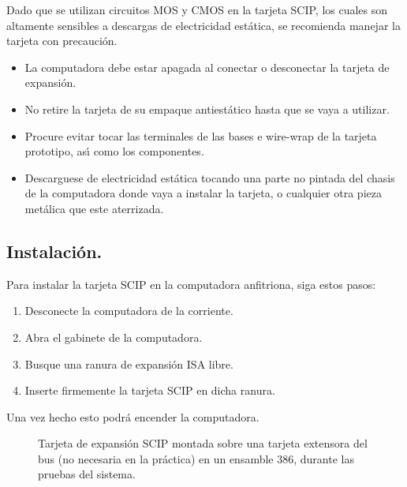 Dado que se utilizan circuitos MOS y CMOS en la tarjeta SCIP, los cuales son altamente sensibles %
a descargas de electricidad est\'atica, se recomienda manejar la tarjeta con precauci\'on.

\begin{itemize}
\item La computadora debe estar apagada al conectar o desconectar la tarjeta de expansi\'on.
\item No retire la tarjeta de su empaque antiest\'atico hasta que se vaya a utilizar.
\item Procure evitar tocar las terminales de las bases e wire-wrap de la tarjeta prototipo, %
as\'{\i} como los componentes.
\item Descarguese de electricidad est\'atica tocando una parte no pintada del chasis de la %
computadora donde vaya a instalar la tarjeta, o cualquier otra pieza met\'alica que este %
aterrizada.
\end{itemize}


\subsection{Instalaci\'on.}
\label{Subsection:instalacion}

Para instalar la tarjeta SCIP en la computadora anfitriona, siga estos pasos:

\begin{enumerate}
\item Desconecte la computadora de la corriente.
\item Abra el gabinete de la computadora.
\item Busque una ranura de expansi\'on ISA libre.
\item Inserte firmemente la tarjeta SCIP en dicha ranura.
\end{enumerate}

Una vez hecho esto podr\'a encender la computadora. 

\begin{figure}[!hbt]
\vskip 5mm
\vskip 78mm
\caption{Tarjeta de expansi\'on SCIP montada sobre una tarjeta extensora del bus (no necesaria %
en la pr\'actica) en un ensamble 386, durante las pruebas del sistema.} 
\label{Figura:montaje}
\end{figure}

